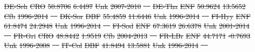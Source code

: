 \documentclass[hess, manuscript]{copernicus}
\providecommand{\DIFdeltex}[1]{{\protect\color{red}\sout{#1}}}                      %
\providecommand{\DIFdel}[1]{\texorpdfstring{\DIFdeltex{#1}}{}} %
\begin{document}
\DIFdel{DE-Seh }%
\DIFdel{CRO }%
\DIFdel{50.8706 }%
\DIFdel{6.4497 }%
\DIFdel{Unk }%
\DIFdel{2007-2010 }%
\DIFdel{\mbox{%
\cite{DE-Seh} }%
}%
\DIFdel{DE-Tha }%
\DIFdel{ENF }%
\DIFdel{50.9624 }%
\DIFdel{13.5652 }%
\DIFdel{Cfb }%
\DIFdel{1996-2014 }%
\DIFdel{\mbox{%
\cite{DE-Tha} }%
}%
\DIFdel{DK-Sor }%
\DIFdel{DBF }%
\DIFdel{55.4859 }%
\DIFdel{11.6446 }%
\DIFdel{Unk }%
\DIFdel{1996-2014 }%
\DIFdel{\mbox{%
\cite{DK-Sor} }%
}%
\DIFdel{FI-Hyy }%
\DIFdel{ENF }%
\DIFdel{61.8474 }%
\DIFdel{24.2948 }%
\DIFdel{Unk }%
\DIFdel{1996-2014 }%
\DIFdel{\mbox{%
\cite{FI-Hyy} }%
}%
\DIFdel{FI-Sod }%
\DIFdel{ENF }%
\DIFdel{67.3619 }%
\DIFdel{26.6378 }%
\DIFdel{Unk }%
\DIFdel{2001-2014 }%
\DIFdel{\mbox{%
\cite{FI-Sod} }%
}%
\DIFdel{FR-Gri }%
\DIFdel{CRO }%
\DIFdel{48.8442 }%
\DIFdel{1.9519 }%
\DIFdel{Cfb }%
\DIFdel{2004-2013 }%
\DIFdel{\mbox{%
\cite{FR-Gri} }%
}%
\DIFdel{FR-LBr }%
\DIFdel{ENF }%
\DIFdel{44.7171 }%
\DIFdel{-0.7693 }%
\DIFdel{Unk }%
\DIFdel{1996-2008 }%
\DIFdel{\mbox{%
\cite{FR-LBr} }%
}%
\DIFdel{IT-Col }%
\DIFdel{DBF }%
\DIFdel{41.8494 }%
\DIFdel{13.5881 }%
\DIFdel{Unk }%
\DIFdel{1996-2014 }%
\DIFdel{\mbox{%
\cite{IT-Col} }%
}%
\end{document}
